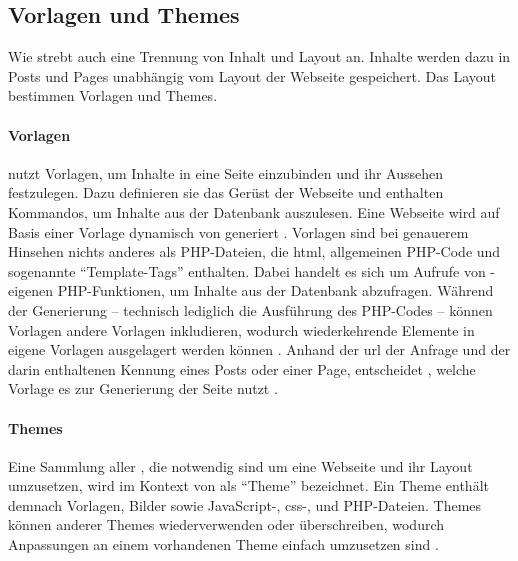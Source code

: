     \subsection{Vorlagen und Themes}
        \label{section:wordpressTemplatesThemes}
        Wie {\imperia} strebt auch {\wordpress} eine Trennung von
        Inhalt und Layout an.
        Inhalte werden dazu in
        Posts und Pages
        unabhängig vom Layout der Webseite gespeichert.
        Das Layout bestimmen Vorlagen und Themes.

        \paragraph*{Vorlagen}
        {\wordpress} nutzt Vorlagen, um Inhalte in eine Seite einzubinden
        und ihr Aussehen festzulegen.
        Dazu definieren sie das Gerüst der Webseite und enthalten Kommandos,
        um Inhalte aus der Datenbank auszulesen.
        Eine Webseite wird auf Basis einer Vorlage dynamisch von {\wordpress} generiert
        \cite{wordpress:Templates}.
        Vorlagen sind bei genauerem Hinsehen nichts anderes als PHP-Dateien,
        die \gls{html}, allgemeinen PHP-Code und sogenannte
        "`Template-Tags"' enthalten.
        Dabei handelt es sich um Aufrufe von
        {\wordpress}-eigenen PHP-Funktionen,
        um Inhalte aus der Datenbank abzufragen.
        Während der Generierung -- technisch lediglich die Ausführung
        des PHP-Codes -- können Vorlagen andere Vorlagen inkludieren,
        wodurch wiederkehrende Elemente in eigene Vorlagen ausgelagert
        werden können \cite{wordpress:TemplateFiles}.
        Anhand der \gls{url} der Anfrage und der darin enthaltenen
        Kennung eines Posts oder einer Page,
        entscheidet {\wordpress}, welche Vorlage es zur Generierung der Seite nutzt
        \cite{wordpress:TemplateHierarchy}.

        \paragraph*{Themes}
        Eine Sammlung aller {\resources}, die notwendig sind um
        eine Webseite und ihr Layout umzusetzen,
        wird im Kontext von {\wordpress} als "`Theme"' bezeichnet.
        Ein Theme enthält demnach Vorlagen, Bilder sowie
        JavaScript-, \gls{css}-, und PHP-Dateien.
        Themes können {\resources} anderer Themes wiederverwenden oder überschreiben,
        wodurch Anpassungen an einem vorhandenen Theme einfach umzusetzen sind
        \cite{wordpress:Themes}.

